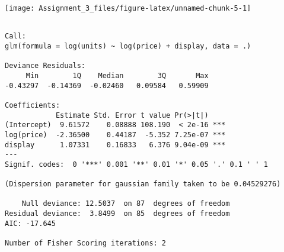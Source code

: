 \documentclass[]{article}
\newenvironment{Shaded}{\begin{snugshade}}{\end{snugshade}}
\newcommand{\CommentTok}[1]{\textcolor[rgb]{0.56,0.35,0.01}{\textit{#1}}}
\newcommand{\DataTypeTok}[1]{\textcolor[rgb]{0.13,0.29,0.53}{#1}}
\newcommand{\KeywordTok}[1]{\textcolor[rgb]{0.13,0.29,0.53}{\textbf{#1}}}
\newcommand{\NormalTok}[1]{#1}
\newcommand{\OperatorTok}[1]{\textcolor[rgb]{0.81,0.36,0.00}{\textbf{#1}}}
\newcommand{\StringTok}[1]{\textcolor[rgb]{0.31,0.60,0.02}{#1}}
\begin{document}
\begin{center}\texttt{[image: Assignment\_3\_files/figure-latex/unnamed-chunk-5-1]} \end{center}

\begin{Shaded}
\end{Shaded}

\begin{verbatim}

Call:
glm(formula = log(units) ~ log(price) + display, data = .)

Deviance Residuals: 
     Min        1Q    Median        3Q       Max  
-0.43297  -0.14369  -0.02460   0.09584   0.59909  

Coefficients:
            Estimate Std. Error t value Pr(>|t|)    
(Intercept)  9.61572    0.08888 108.190  < 2e-16 ***
log(price)  -2.36500    0.44187  -5.352 7.25e-07 ***
display      1.07331    0.16833   6.376 9.04e-09 ***
---
Signif. codes:  0 '***' 0.001 '**' 0.01 '*' 0.05 '.' 0.1 ' ' 1

(Dispersion parameter for gaussian family taken to be 0.04529276)

    Null deviance: 12.5037  on 87  degrees of freedom
Residual deviance:  3.8499  on 85  degrees of freedom
AIC: -17.645

Number of Fisher Scoring iterations: 2
\end{verbatim}

\begin{Shaded}
\end{Shaded}
\end{document}
